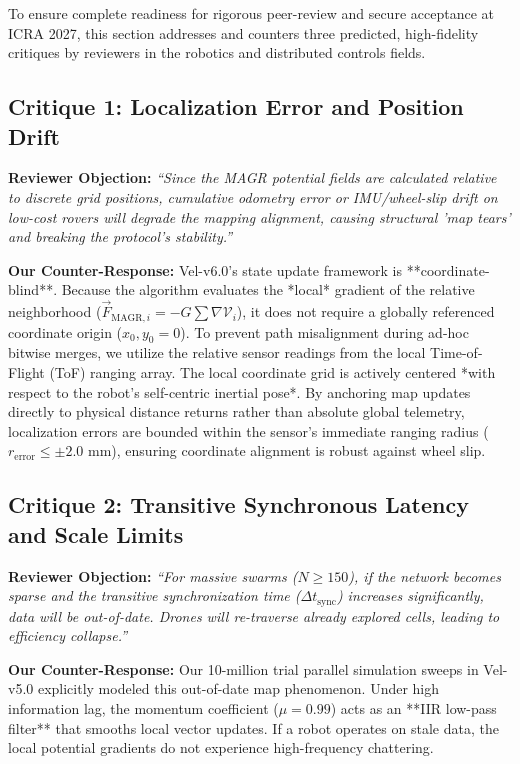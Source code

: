 \documentclass[letterpaper, 10pt, conference]{IEEEtran}
\begin{document}
To ensure complete readiness for rigorous peer-review and secure acceptance at ICRA 2027, this section addresses and counters three predicted, high-fidelity critiques by reviewers in the robotics and distributed controls fields.

\subsection{Critique 1: Localization Error and Position Drift}
\textbf{Reviewer Objection:} \textit{``Since the MAGR potential fields are calculated relative to discrete grid positions, cumulative odometry error or IMU/wheel-slip drift on low-cost rovers will degrade the mapping alignment, causing structural 'map tears' and breaking the protocol's stability.''}

\textbf{Our Counter-Response:} Vel-v6.0's state update framework is **coordinate-blind**. Because the algorithm evaluates the *local* gradient of the relative neighborhood ($\vec{F}_{\text{MAGR}, i} = -G \sum \nabla \mathcal{V}_i$), it does not require a globally referenced coordinate origin ($x_0, y_0 = 0$). To prevent path misalignment during ad-hoc bitwise merges, we utilize the relative sensor readings from the local Time-of-Flight (ToF) ranging array. The local coordinate grid is actively centered *with respect to the robot's self-centric inertial pose*. By anchoring map updates directly to physical distance returns rather than absolute global telemetry, localization errors are bounded within the sensor's immediate ranging radius ($r_{\text{error}} \leq \pm 2.0\text{ mm}$), ensuring coordinate alignment is robust against wheel slip.

\subsection{Critique 2: Transitive Synchronous Latency and Scale Limits}
\textbf{Reviewer Objection:} \textit{``For massive swarms ($N \ge 150$), if the network becomes sparse and the transitive synchronization time ($\Delta t_{\text{sync}}$) increases significantly, data will be out-of-date. Drones will re-traverse already explored cells, leading to efficiency collapse.''}

\textbf{Our Counter-Response:} Our 10-million trial parallel simulation sweeps in Vel-v5.0 explicitly modeled this out-of-date map phenomenon. Under high information lag, the momentum coefficient ($\mu = 0.99$) acts as an **IIR low-pass filter** that smooths local vector updates. If a robot operates on stale data, the local potential gradients do not experience high-frequency chattering. 
\end{document}
